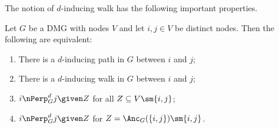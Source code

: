 The notion of $d$-inducing walk has the following important properties.
\begin{Prp}\label{prp:d-inducing_path_properties}
  Let $G$ be a DMG with nodes $V$ and let $i,j \in V$ be distinct nodes. 
  Then the following are equivalent:
  \begin{enumerate}[label=(\roman*)]
    \item There is a $d$-inducing path in $G$ between $i$ and $j$;\label{prp:d-inducing_path_properties2:i}
    \item There is a $d$-inducing walk in $G$ between $i$ and $j$;\label{prp:d-inducing_path_properties2:ii}
    \item $i \nPerp^d_G j \given Z$ for all $Z \subseteq V \sm \{i,j\}$;\label{prp:d-inducing_path_properties2:iii}
    \item $i \nPerp^d_G j \given Z$ for $Z = \Anc_G(\{i,j\}) \sm \{i,j\}$.\label{prp:d-inducing_path_properties2:iv}
  \end{enumerate}
\end{Prp}
